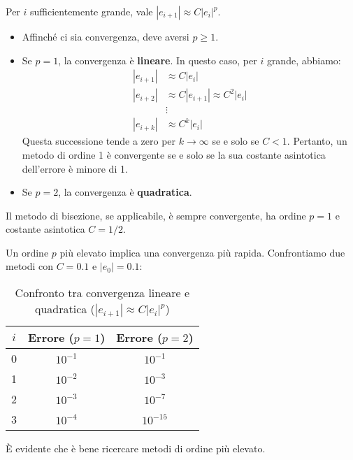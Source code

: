 Per $i$ sufficientemente grande, vale $|e_{i+1}| \approx C |e_i|^p$.
\begin{itemize}
    \item Affinché ci sia convergenza, deve aversi $p \ge 1$.
    \item Se $p=1$, la convergenza è \textbf{lineare}. In questo caso, per $i$ grande, abbiamo:
          \begin{align*}
              |e_{i+1}| &\approx C |e_i| \\
              |e_{i+2}| &\approx C |e_{i+1}| \approx C^2 |e_i| \\
              &\vdots \\
              |e_{i+k}| &\approx C^k |e_i| 
          \end{align*}
          Questa successione tende a zero per $k \to \infty$ se e solo se $C < 1$. Pertanto, un metodo di ordine 1 è convergente se e solo se la sua costante asintotica dell'errore è minore di 1.
    \item Se $p=2$, la convergenza è \textbf{quadratica}.
    
\end{itemize}

\begin{osservazione}
Il metodo di bisezione, se applicabile, è sempre convergente, ha ordine $p=1$ e costante asintotica $C=1/2$.
\end{osservazione}

Un ordine $p$ più elevato implica una convergenza più rapida. Confrontiamo due metodi con $C=0.1$ e $|e_0|=0.1$:

\begin{table}[ht!]
\centering
\caption{Confronto tra convergenza lineare e quadratica ($|e_{i+1}| \approx C|e_i|^p$)}
\begin{tabular}{ccc}
\toprule
$i$ & Errore ($p=1$) & Errore ($p=2$) \\
\midrule
0 & $10^{-1}$ & $10^{-1}$ \\
1 & $10^{-2}$ & $10^{-3}$ \\
2 & $10^{-3}$ & $10^{-7}$ \\
3 & $10^{-4}$ & $10^{-15}$ \\
\bottomrule
\end{tabular}
\end{table}
È evidente che è bene ricercare metodi di ordine più elevato.

